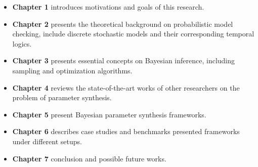 \begin{itemize}
      \item \textbf{Chapter 1} introduces motivations and goals of this research.
      \item \textbf{Chapter 2} presents the theoretical background on probabilistic model checking,
            include discrete stochastic models and their  corresponding temporal logics.
      \item \textbf{Chapter 3} presents essential concepts on Bayesian inference, including sampling
            and optimization algorithms.
      \item \textbf{Chapter 4} reviews the state-of-the-art works of other researchers on the
            problem of parameter synthesis.
      \item \textbf{Chapter 5} present Bayesian parameter synthesis frameworks.
      \item \textbf{Chapter 6} describes case studies and benchmarks presented frameworks under
            different setups.
      \item \textbf{Chapter 7} conclusion and possible future works.
\end{itemize}

